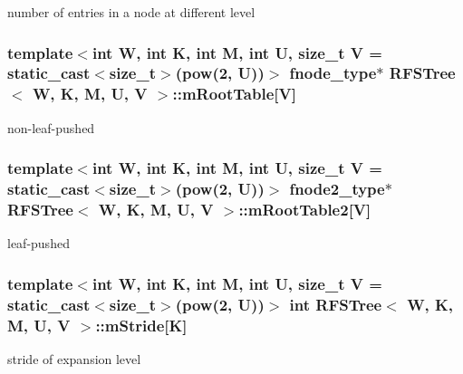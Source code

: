 number of entries in a node at different level 

\hypertarget{classRFSTree_a808e44b5d80b37411742e657bd4ba526}{
\subsubsection[{m\-Root\-Table}]{\setlength{\rightskip}{0pt plus 5cm}template$<$int W, int K, int M, int U, size\-\_\-t V = static\-\_\-cast$<$size\-\_\-t$>$(pow(2, U))$>$ {\bf fnode\-\_\-type}$\ast$ {\bf R\-F\-S\-Tree}$<$ {\bf W}, K, M, U, V $>$\-::m\-Root\-Table\mbox{[}V\mbox{]}\hspace{0.3cm}{\ttfamily [private]}}}\label{classRFSTree_a808e44b5d80b37411742e657bd4ba526}


non-\/leaf-\/pushed 

\hypertarget{classRFSTree_a15a1ae729c49a0b6fa355ec4c7428f53}{
\subsubsection[{m\-Root\-Table2}]{\setlength{\rightskip}{0pt plus 5cm}template$<$int W, int K, int M, int U, size\-\_\-t V = static\-\_\-cast$<$size\-\_\-t$>$(pow(2, U))$>$ {\bf fnode2\-\_\-type}$\ast$ {\bf R\-F\-S\-Tree}$<$ {\bf W}, K, M, U, V $>$\-::m\-Root\-Table2\mbox{[}V\mbox{]}\hspace{0.3cm}{\ttfamily [private]}}}\label{classRFSTree_a15a1ae729c49a0b6fa355ec4c7428f53}


leaf-\/pushed 

\hypertarget{classRFSTree_a381610989dd245063f297bd400adc841}{
\subsubsection[{m\-Stride}]{\setlength{\rightskip}{0pt plus 5cm}template$<$int W, int K, int M, int U, size\-\_\-t V = static\-\_\-cast$<$size\-\_\-t$>$(pow(2, U))$>$ int {\bf R\-F\-S\-Tree}$<$ {\bf W}, K, M, U, V $>$\-::m\-Stride\mbox{[}K\mbox{]}\hspace{0.3cm}{\ttfamily [private]}}}\label{classRFSTree_a381610989dd245063f297bd400adc841}


stride of expansion level 

